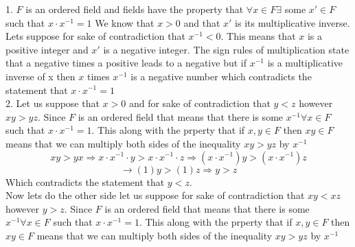 \documentclass{report}
\begin{document}

\begin{proofWithHibiscus}
  1. $F$ is an ordered field and fields have the property that $\forall x \in F \exists$ some $x' \in F$ such that $x \cdot x^{-1} = 1$ 
  We know that $x > 0$ and that $x'$ is its multiplicative inverse. Lets suppose for sake of contradiction that 
  $x^{-1} < 0$. This means that $x$ is a positive integer and $x'$ is a negative integer. The sign rules of multiplication 
  state that a negative times a positive leads to a negative but if $x^{-1}$ is a multiplicative inverse of x 
  then $x$ times $x^{-1}$ is a negative number which contradicts the statement that $x \cdot x ^{-1} = 1$  \\

  2. Let us suppose that $x > 0$ and for sake of contradiction that $y < z$ however $xy > yz$. Since $F$ is an ordered field that 
  means that there is some $x^{-1} \forall x \in F$ such that $x \cdot x^{-1} = 1$. This along with the 
  prperty that if $x, y \in F$ then $xy \in F$ means that we can multiply both sides of the inequality $xy > yz$ by $x^{-1}$ 
  \[ xy > yx \Rightarrow x \cdot x^{-1} \cdot y > x \cdot x^{-1} \cdot z \Rightarrow (x \cdot x^{-1})y > (x \cdot x^{-1})z \]
  \[ \rightarrow (1)y > (1)z \Rightarrow y > z \]  Which contradicts the statement that $y < z$. \\
  Now lets do the other side let us suppose for sake of contradiction that $xy < xz$ however $y > z$. Since $F$ is an ordered field that 
  means that there is some $x^{-1} \forall x \in F$ such that $x \cdot x^{-1} = 1$. This along with the 
  prperty that if $x, y \in F$ then $xy \in F$ means that we can multiply both sides of the inequality $xy > yz$ by $x^{-1}$ 
\end{proofWithHibiscus}

\end{document}
